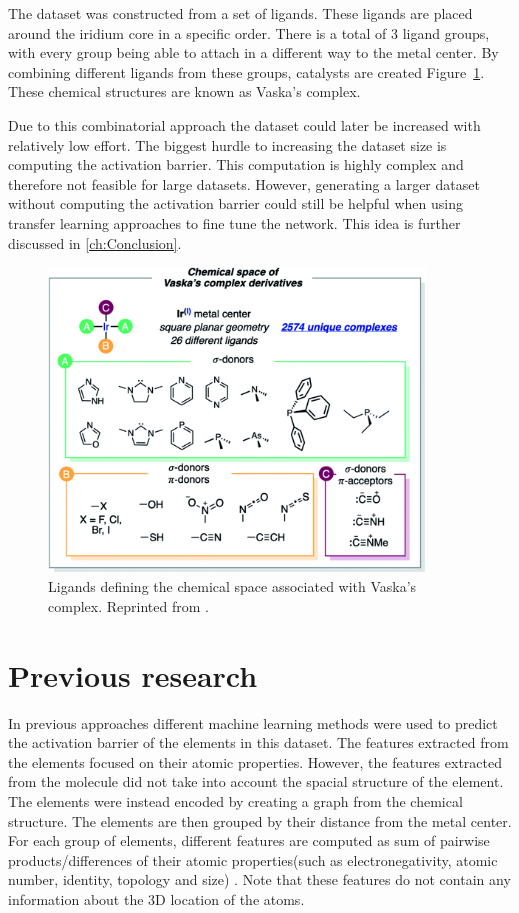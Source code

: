 The dataset was constructed from a set of ligands.
These ligands are placed around the iridium core in a specific order.
There is a total of 3 ligand groups, with every group being able to attach in a different way to the metal center.
By combining different ligands from these groups, catalysts are created Figure~\ref{fig:chemspace}.
These chemical structures are known as Vaska's complex.

Due to this combinatorial approach the dataset could later be increased with relatively low effort.
The biggest hurdle to increasing the dataset size is computing the activation barrier.
This computation is highly complex and therefore not feasible for large datasets.
However, generating a larger dataset without computing the activation barrier could still be helpful when using transfer learning approaches to fine tune the network.
This idea is further discussed in \ref{ch:Conclusion}.

\begin{figure}
  \centering
  \includegraphics[width=10cm]{figures/introduction/chem-space.png}
  \caption{Ligands defining the chemical space associated with Vaska's complex. Reprinted from \cite{friederich_dos}.}
  \label{fig:chemspace}
\end{figure}


\section{Previous research}

In previous approaches different machine learning methods were used to predict the activation barrier of the elements in this dataset.
The features extracted from the elements focused on their atomic properties.
However, the features extracted from the molecule did not take into account the spacial structure of the element.
The elements were instead encoded by creating a graph from the chemical structure.
The elements are then grouped by their distance from the metal center.
For each group of elements, different features are computed as sum of pairwise products/differences of their atomic properties(such as electronegativity, atomic number, identity, topology and size) \cite{friederich_dos}.
Note that these features do not contain any information about the 3D location of the atoms.

